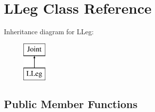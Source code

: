 \hypertarget{class_l_leg}{\section{L\-Leg Class Reference}
\label{class_l_leg}
}
Inheritance diagram for L\-Leg\-:\begin{figure}[H]
\begin{center}
\leavevmode
\includegraphics[height=2.000000cm]{class_l_leg}
\end{center}
\end{figure}
\subsection*{Public Member Functions}
